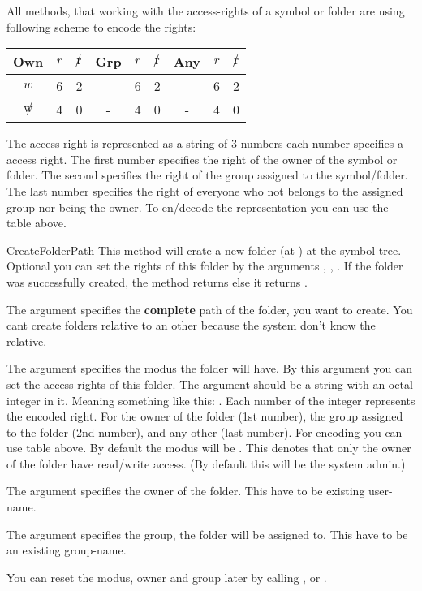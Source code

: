 All methods, that working with the access-rights of a symbol or folder
are using following scheme to encode the rights:

\begin{center}
\begin{tabular}{|c|cc||c|cc||c|cc|} \hline\hline
\bf{Own} & $r$&$\not r$&\bf{Grp}&$r$ & $\not r$ & \bf{Any} & $r$ & $\not r$\\\hline
$w$ & 6 & 2 & - & 6 & 2 & - & 6 & 2 \\
$\not w$ & 4 & 0 & - & 4 & 0 & - & 4 & 0 \\\hline\hline
\end{tabular}
\end{center}
The access-right is represented as a string of 3 numbers each number specifies 
a access right. The first number specifies the right of the owner of the 
symbol or folder. The second specifies the right of the group assigned to the 
symbol/folder.  The last number specifies the right of everyone who not 
belongs to the assigned group nor being the owner. To en/decode the 
representation you can use the table above.


\begin{methoddesc}[System]{CreateFolder}{Path}
This method will crate a new folder (at ) at the symbol-tree. 
Optional you can set the rights of this folder by the arguments , 
, . If the folder was successfully created, the method 
returns  else it returns .

The argument  specifies the \textbf{complete} path of the folder, 
you want to create. You cant create folders relative to an other because the 
system don't know the relative.

The argument  specifies the modus the folder will have. By this 
argument you can set the access rights of this folder. The argument should be
a string with an octal integer in it. Meaning something like this: .
Each number of the integer represents the encoded right. For the owner of the
folder (1st number), the group assigned to the folder (2nd number), and any other
(last number). For encoding you can use table above. 
By default the modus will be . This denotes that only the owner 
of the folder have read/write access. (By default this will be the system admin.)

The argument  specifies the owner of the folder. This have to be 
existing user-name. 

The argument  specifies the group, the folder will be assigned to. 
This have to be an existing group-name.

\begin{notice}
You can reset the modus, owner and group later by calling 
,  or .
\end{notice}
\end{methoddesc}


